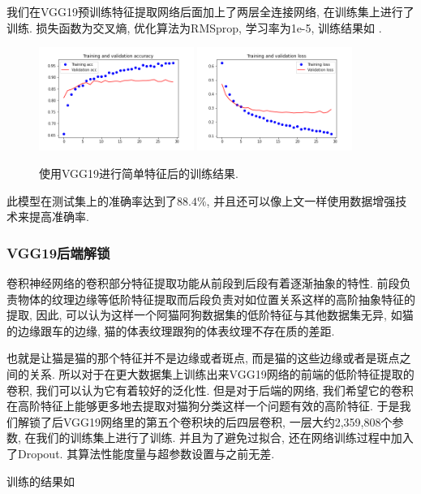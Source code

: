 \documentclass[lang=cn,11pt]{elegantpaper}
\begin{document}
我们在VGG19预训练特征提取网络后面加上了两层全连接网络, 在训练集上进行了训练. 损失函数为交叉熵, 优化算法为RMSprop, 学习率为1e-5, 训练结果如 .
\begin{figure}[htbp]
	\centering
	  \includegraphics[width=0.45\textwidth]{VGG_classify_1}
	  \includegraphics[width=0.45\textwidth]{VGG_classify_2}
	  \caption{使用VGG19进行简单特征后的训练结果. \label{fig:ab1}}
	\end{figure}

此模型在测试集上的准确率达到了$88.4\%$, 并且还可以像上文一样使用数据增强技术来提高准确率. 
\subsubsection{VGG19后端解锁}

卷积神经网络的卷积部分特征提取功能从前段到后段有着逐渐抽象的特性. 前段负责物体的纹理边缘等低阶特征提取而后段负责对如位置关系这样的高阶抽象特征的提取, 因此, 可以认为这样一个阿猫阿狗数据集的低阶特征与其他数据集无异, 如猫的边缘跟车的边缘, 猫的体表纹理跟狗的体表纹理不存在质的差距. 

也就是让猫是猫的那个特征并不是边缘或者斑点, 而是猫的这些边缘或者是斑点之间的关系. 所以对于在更大数据集上训练出来VGG19网络的前端的低阶特征提取的卷积, 我们可以认为它有着较好的泛化性. 但是对于后端的网络, 我们希望它的卷积在高阶特征上能够更多地去提取对猫狗分类这样一个问题有效的高阶特征. 于是我们解锁了后VGG19网络里的第五个卷积块的后四层卷积, 一层大约2,359,808个参数, 在我们的训练集上进行了训练. 并且为了避免过拟合, 还在网络训练过程中加入了Dropout. 其算法性能度量与超参数设置与之前无差.

训练的结果如 
\end{document}
